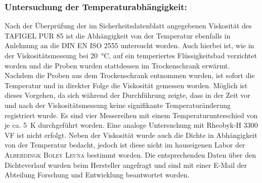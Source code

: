 \begin{table}[h!]
	\renewcommand*{\arraystretch}{1.2}
	\centering
	\caption{Viskositätsbereiche der verschiedenen Spindeln in Abhängigkeit von der Drehzahl, erstellt nach \cite{brookfield_31.01.2022}}
	\label{tab:spindelwahl}
\end{table}%
\FloatBarrier

\subsubsection{Untersuchung der Temperaturabhängigkeit:} 
Nach der Überprüfung der im Sicherheitsdatenblatt angegebenen Viskosität des TAFIGEL PUR 85 ist die Abhängigkeit von der Temperatur ebenfalls in Anlehnung an die DIN EN ISO 2555 untersucht worden. Auch hierbei ist, wie in der Viskositätsmessung bei \SI{20}{\celsius}, auf ein temperiertes Flüssigkeitsbad verzichtet worden und die Proben wurden stattdessen im Trockenschrank erwärmt. Nachdem die Proben aus dem Trockenschrank entnommen wurden, ist sofort die Temperatur und in direkter Folge die Viskosität gemessen worden. Möglich ist dieses Vorgehen, da sich während der Durchführung zeigte, dass in der Zeit vor und nach der Viskositätsmessung keine signifikante Temperaturänderung registriert wurde. Es sind vier Messereihen mit einem Temperaturunterschied von je ca. \SI{5}{\kelvin} durchgeführt worden. Eine analoge Untersuchung mit Rheobyk-H 3300 VF ist nicht erfolgt.\linebreak
Neben der Viskosität wurde auch die Dichte in Abhängigkeit von der Temperatur bedacht, jedoch ist diese nicht im hauseigenen Labor der \textsc{Alberdingk Boley Leuna} bestimmt worden. Die entsprechenden Daten über den Dichteverlauf wurden beim Hersteller angefragt und sind mit einer E-Mail der Abteilung Forschung und Entwicklung beantwortet worden.

